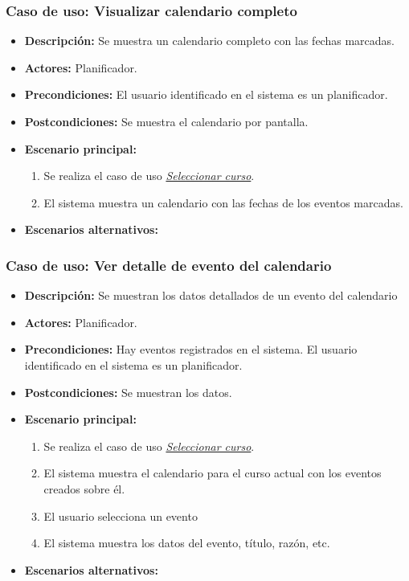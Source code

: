 \subsubsection*{Caso de uso: Visualizar calendario completo}
\begin{itemize}
\item{\bf Descripción:} Se muestra un calendario completo con las fechas marcadas.
\item{\bf Actores:} Planificador.
\item{\bf Precondiciones:} El usuario identificado en el sistema es un planificador.
\item{\bf Postcondiciones:} Se muestra el calendario por pantalla.
\item{\bf Escenario principal:}
	\begin{enumerate}
	\item Se realiza el caso de uso {\em \hyperref[select_curso]{Seleccionar curso}}.
	\item El sistema muestra un calendario con las fechas de los eventos marcadas.
	\end{enumerate}
\item{\bf Escenarios alternativos:}
\end{itemize}


\subsubsection*{Caso de uso: Ver detalle de evento del calendario}
\begin{itemize}
\item{\bf Descripción:} Se muestran los datos detallados de un evento del calendario
\item{\bf Actores:} Planificador.
\item{\bf Precondiciones:} Hay eventos registrados en el sistema. El usuario identificado en el sistema es un planificador.
\item{\bf Postcondiciones:} Se muestran los datos.
\item{\bf Escenario principal:}
	\begin{enumerate}
	\item Se realiza el caso de uso {\em \hyperref[select_curso]{Seleccionar curso}}.
	\item El sistema muestra el calendario para el curso actual con los eventos creados sobre él.
	\item El usuario selecciona un evento
	\item El sistema muestra los datos del evento, título, razón, etc.
	\end{enumerate}
\item{\bf Escenarios alternativos:}
\end{itemize}




